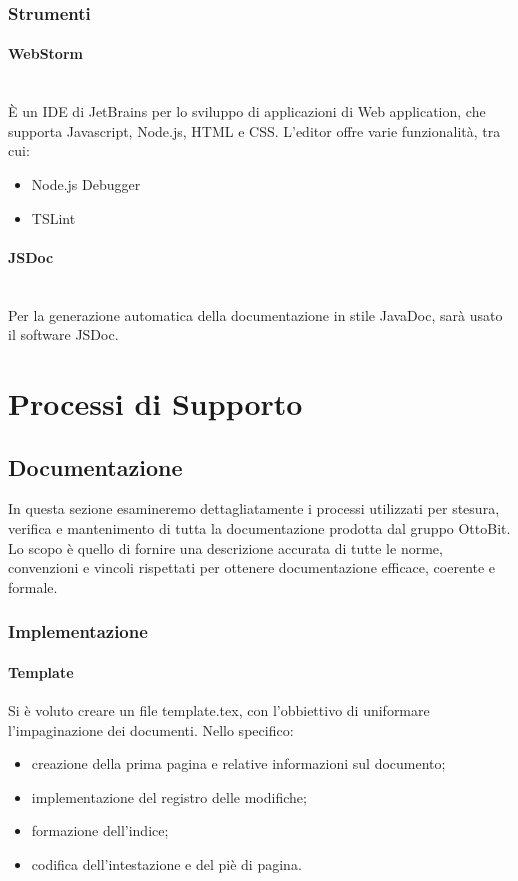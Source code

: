 \documentclass[11pt,a4paper]{article}
\begin{document}
{\begin{lstlisting}[caption=Esempio di commento ad un metodo]
	\end{lstlisting}
	
	\subsubsection{Strumenti}
	\paragraph{WebStorm} \noindent \\
	È un IDE di JetBrains per lo sviluppo di applicazioni di Web application, che supporta Javascript, Node.js, HTML e CSS.
	L'editor offre varie funzionalità, tra cui:
	\begin{itemize}
		\item Node.js Debugger
		\item TSLint
	\end{itemize}

	\paragraph{JSDoc}
\noindent \\
	Per la generazione automatica della documentazione in stile JavaDoc, sarà usato il software JSDoc.
	
	
		\section{Processi di Supporto}
	\subsection{Documentazione}
	In questa sezione esamineremo dettagliatamente i processi utilizzati per stesura, verifica e mantenimento di tutta la documentazione prodotta dal gruppo OttoBit.
	Lo scopo è quello di fornire una descrizione accurata di tutte le norme, convenzioni e vincoli rispettati per ottenere documentazione efficace, coerente e formale.
	\subsubsection{Implementazione}
	
	\paragraph{Template\\}
	Si è voluto creare un file template.tex, con l'obbiettivo di uniformare l'impaginazione dei documenti. 
	Nello specifico:
	\begin{itemize}
		\item{creazione della prima pagina e relative informazioni sul documento;}
		\item{implementazione del registro delle modifiche;}
		\item{formazione dell'indice;}
		\item {codifica dell'intestazione e del piè di pagina.}
		

\end{itemize}}
\end{document}
